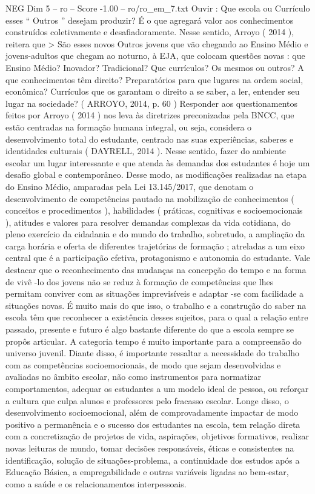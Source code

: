 \begin{textsample}{NEG Dim 5 – ro – Score -1.00 – ro/ro\_em\_7.txt}
Ouvir : Que escola ou Currículo esses “ Outros ” desejam produzir?
É o que agregará valor aos conhecimentos construídos coletivamente e desafiadoramente.
Nesse sentido, Arroyo ( 2014 ), reitera que > São esses novos Outros jovens que vão chegando ao Ensino Médio e jovens-adultos que chegam ao noturno, à EJA, que colocam questões novas : que Ensino Médio?
Inovador?
Tradicional?
Que currículos?
Os mesmos ou outros?
A que conhecimentos têm direito?
Preparatórios para que lugares na ordem social, econômica?
Currículos que os garantam o direito a se saber, a ler, entender seu lugar na sociedade? ( ARROYO, 2014, p. 60 ) Responder aos questionamentos feitos por Arroyo ( 2014 ) nos leva às diretrizes preconizadas pela BNCC, que estão centradas na formação humana integral, ou seja, considera o desenvolvimento total do estudante, centrado nas suas experiências, saberes e identidades culturais ( DAYRELL, 2014 ).
Nesse sentido, fazer do ambiente escolar um lugar interessante e que atenda às demandas dos estudantes é hoje um desafio global e contemporâneo.
Desse modo, as modificações realizadas na etapa do Ensino Médio, amparadas pela Lei 13.145/2017, que denotam o desenvolvimento de competências pautado na mobilização de conhecimentos ( conceitos e procedimentos ), habilidades ( práticas, cognitivas e socioemocionais ), atitudes e valores para resolver demandas complexas da vida cotidiana, do pleno exercício da cidadania e do mundo do trabalho, sobretudo, a ampliação da carga horária e oferta de diferentes trajetórias de formação ; atreladas a um eixo central que é a participação efetiva, protagonismo e autonomia do estudante.
Vale destacar que o reconhecimento das mudanças na concepção do tempo e na forma de vivê -lo dos jovens não se reduz à formação de competências que lhes permitam conviver com as situações imprevisíveis e adaptar -se com facilidade a situações novas.
É muito mais do que isso, o trabalho e a construção do saber na escola têm que reconhecer a existência desses sujeitos, para o qual a relação entre passado, presente e futuro é algo bastante diferente do que a escola sempre se propôs articular.
A categoria tempo é muito importante para a compreensão do universo juvenil.
Diante disso, é importante ressaltar a necessidade do trabalho com as competências socioemocionais, de modo que sejam desenvolvidas e avaliadas no âmbito escolar, não como instrumentos para normatizar comportamentos, adequar os estudantes a um modelo ideal de pessoa, ou reforçar a cultura que culpa alunos e professores pelo fracasso escolar.
Longe disso, o desenvolvimento socioemocional, além de comprovadamente impactar de modo positivo a permanência e o sucesso dos estudantes na escola, tem relação direta com a concretização de projetos de vida, aspirações, objetivos formativos, realizar novas leituras de mundo, tomar decisões responsáveis, éticas e consistentes na identificação, solução de situações-problema, a continuidade dos estudos após a Educação Básica, a empregabilidade e outras variáveis ligadas ao bem-estar, como a saúde e os relacionamentos interpessoais.

\end{textsample}
